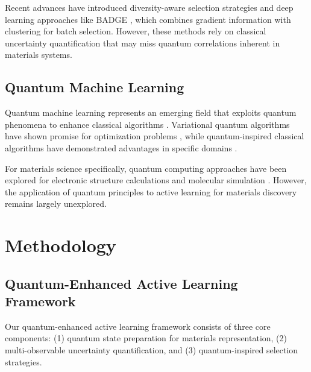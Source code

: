 \documentclass[twocolumn]{article}
\begin{document}
Recent advances have introduced diversity-aware selection strategies and deep learning approaches like BADGE \cite{ash2019deep}, which combines gradient information with clustering for batch selection. However, these methods rely on classical uncertainty quantification that may miss quantum correlations inherent in materials systems.

\subsection{Quantum Machine Learning}

Quantum machine learning represents an emerging field that exploits quantum phenomena to enhance classical algorithms \cite{wittek2014quantum, biamonte2017quantum}. Variational quantum algorithms have shown promise for optimization problems \cite{cerezo2021variational}, while quantum-inspired classical algorithms have demonstrated advantages in specific domains \cite{tang2019quantum}.

For materials science specifically, quantum computing approaches have been explored for electronic structure calculations and molecular simulation \cite{mcardle2020quantum, cao2019quantum}. However, the application of quantum principles to active learning for materials discovery remains largely unexplored.

\section{Methodology}

\subsection{Quantum-Enhanced Active Learning Framework}

Our quantum-enhanced active learning framework consists of three core components: (1) quantum state preparation for materials representation, (2) multi-observable uncertainty quantification, and (3) quantum-inspired selection strategies.
\end{document}
